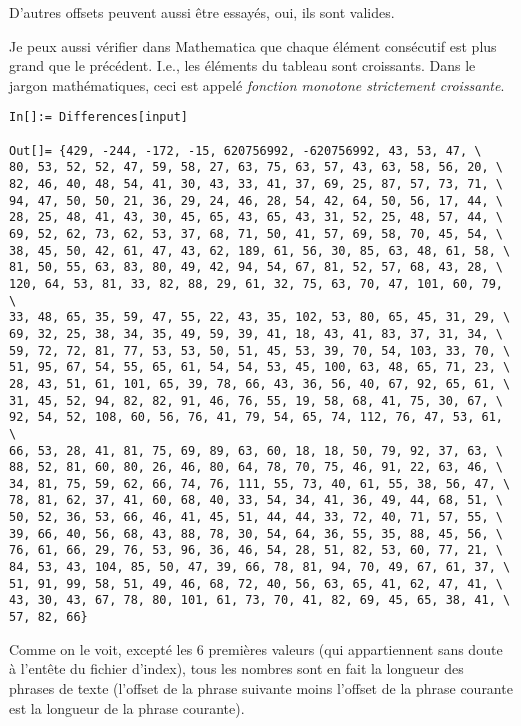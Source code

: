 D'autres offsets peuvent aussi être essayés, oui, ils sont valides.

Je peux aussi vérifier dans Mathematica que chaque élément consécutif est plus grand
que le précédent.
I.e., les éléments du tableau sont croissants.
Dans le jargon mathématiques, ceci est appelé \emph{fonction monotone strictement croissante}.

\begin{lstlisting}[style=custommath]
In[]:= Differences[input]

Out[]= {429, -244, -172, -15, 620756992, -620756992, 43, 53, 47, \
80, 53, 52, 52, 47, 59, 58, 27, 63, 75, 63, 57, 43, 63, 58, 56, 20, \
82, 46, 40, 48, 54, 41, 30, 43, 33, 41, 37, 69, 25, 87, 57, 73, 71, \
94, 47, 50, 50, 21, 36, 29, 24, 46, 28, 54, 42, 64, 50, 56, 17, 44, \
28, 25, 48, 41, 43, 30, 45, 65, 43, 65, 43, 31, 52, 25, 48, 57, 44, \
69, 52, 62, 73, 62, 53, 37, 68, 71, 50, 41, 57, 69, 58, 70, 45, 54, \
38, 45, 50, 42, 61, 47, 43, 62, 189, 61, 56, 30, 85, 63, 48, 61, 58, \
81, 50, 55, 63, 83, 80, 49, 42, 94, 54, 67, 81, 52, 57, 68, 43, 28, \
120, 64, 53, 81, 33, 82, 88, 29, 61, 32, 75, 63, 70, 47, 101, 60, 79, \
33, 48, 65, 35, 59, 47, 55, 22, 43, 35, 102, 53, 80, 65, 45, 31, 29, \
69, 32, 25, 38, 34, 35, 49, 59, 39, 41, 18, 43, 41, 83, 37, 31, 34, \
59, 72, 72, 81, 77, 53, 53, 50, 51, 45, 53, 39, 70, 54, 103, 33, 70, \
51, 95, 67, 54, 55, 65, 61, 54, 54, 53, 45, 100, 63, 48, 65, 71, 23, \
28, 43, 51, 61, 101, 65, 39, 78, 66, 43, 36, 56, 40, 67, 92, 65, 61, \
31, 45, 52, 94, 82, 82, 91, 46, 76, 55, 19, 58, 68, 41, 75, 30, 67, \
92, 54, 52, 108, 60, 56, 76, 41, 79, 54, 65, 74, 112, 76, 47, 53, 61, \
66, 53, 28, 41, 81, 75, 69, 89, 63, 60, 18, 18, 50, 79, 92, 37, 63, \
88, 52, 81, 60, 80, 26, 46, 80, 64, 78, 70, 75, 46, 91, 22, 63, 46, \
34, 81, 75, 59, 62, 66, 74, 76, 111, 55, 73, 40, 61, 55, 38, 56, 47, \
78, 81, 62, 37, 41, 60, 68, 40, 33, 54, 34, 41, 36, 49, 44, 68, 51, \
50, 52, 36, 53, 66, 46, 41, 45, 51, 44, 44, 33, 72, 40, 71, 57, 55, \
39, 66, 40, 56, 68, 43, 88, 78, 30, 54, 64, 36, 55, 35, 88, 45, 56, \
76, 61, 66, 29, 76, 53, 96, 36, 46, 54, 28, 51, 82, 53, 60, 77, 21, \
84, 53, 43, 104, 85, 50, 47, 39, 66, 78, 81, 94, 70, 49, 67, 61, 37, \
51, 91, 99, 58, 51, 49, 46, 68, 72, 40, 56, 63, 65, 41, 62, 47, 41, \
43, 30, 43, 67, 78, 80, 101, 61, 73, 70, 41, 82, 69, 45, 65, 38, 41, \
57, 82, 66}
\end{lstlisting}

Comme on le voit, excepté les 6 premières valeurs (qui appartiennent sans doute à
l'entête du fichier d'index), tous les nombres sont en fait la longueur des phrases
de texte (l'offset de la phrase suivante moins l'offset de la phrase courante est
la longueur de la phrase courante).

